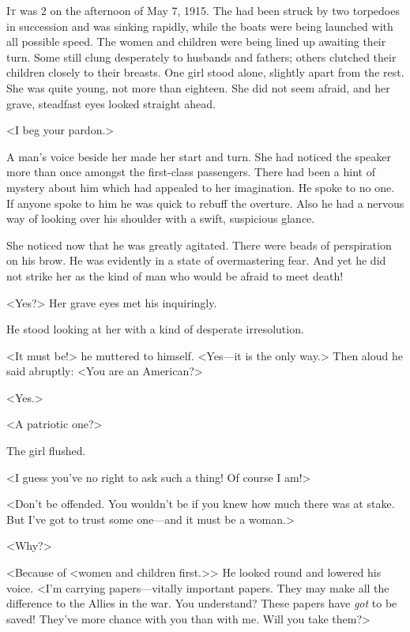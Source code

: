 
\lettrine{I}{t} was 2  on the afternoon of May 7, 1915. The  had been struck by two torpedoes in succession and was sinking rapidly, while the boats were being launched with all possible speed. The women and children were being lined up awaiting their turn. Some still clung desperately to husbands and fathers; others clutched their children closely to their breasts. One girl stood alone, slightly apart from the rest. She was quite young, not more than eighteen. She did not seem afraid, and her grave, steadfast eyes looked straight ahead.

<I beg your pardon.>

A man's voice beside her made her start and turn. She had noticed the speaker more than once amongst the first-class passengers. There had been a hint of mystery about him which had appealed to her imagination. He spoke to no one. If anyone spoke to him he was quick to rebuff the overture. Also he had a nervous way of looking over his shoulder with a swift, suspicious glance.

She noticed now that he was greatly agitated. There were beads of perspiration on his brow. He was evidently in a state of overmastering fear. And yet he did not strike her as the kind of man who would be afraid to meet death!

<Yes?> Her grave eyes met his inquiringly.

He stood looking at her with a kind of desperate irresolution.

<It must be!> he muttered to himself. <Yes—it is the only way.> Then aloud he said abruptly: <You are an American?>

<Yes.>

<A patriotic one?>

The girl flushed.

<I guess you've no right to ask such a thing! Of course I am!>

<Don't be offended. You wouldn't be if you knew how much there was at stake. But I've got to trust some one—and it must be a woman.>

<Why?>

<Because of <women and children first.>> He looked round and lowered his voice. <I'm carrying papers—vitally important papers. They may make all the difference to the Allies in the war. You understand? These papers have \emph{got} to be saved! They've more chance with you than with me. Will you take them?>

